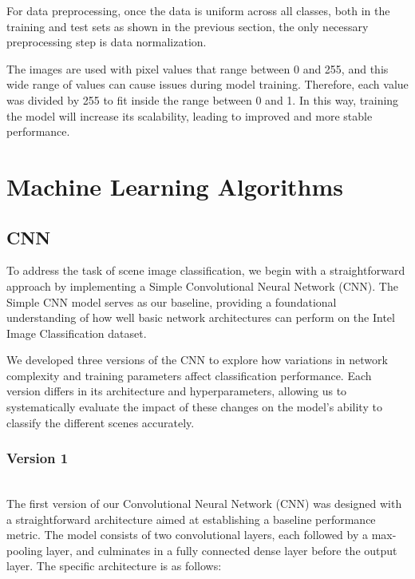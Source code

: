 \documentclass[conference]{IEEEtran}
\begin{document}
For data preprocessing, once the data is uniform across all classes, both in the training and test sets as shown in the previous section, the only necessary preprocessing step is data normalization.

The images are used with pixel values that range between 0 and 255, and this wide range of values can cause issues during model training. Therefore, each value was divided by 255 to fit inside the range between 0 and 1. In this way, training the model will increase its scalability, leading to improved and more stable performance.

\section{Machine Learning Algorithms}


\subsection{CNN}

To address the task of scene image classification, we begin with a straightforward approach by implementing a Simple Convolutional Neural Network (CNN). The Simple CNN model serves as our baseline, providing a foundational understanding of how well basic network architectures can perform on the Intel Image Classification dataset.

We developed three versions of the CNN to explore how variations in network complexity and training parameters affect classification performance. Each version differs in its architecture and hyperparameters, allowing us to systematically evaluate the impact of these changes on the model's ability to classify the different scenes accurately. 

\vspace{2mm}

\subsubsection{Version 1}
\hfill\\

The first version of our Convolutional Neural Network (CNN) was designed with a straightforward architecture aimed at establishing a baseline performance metric. The model consists of two convolutional layers, each followed by a max-pooling layer, and culminates in a fully connected dense layer before the output layer. The specific architecture is as follows:
\end{document}
